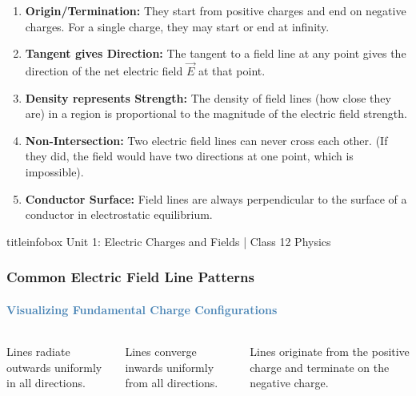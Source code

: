 \begin{frame}
\begin{frame}
\vspace{0.3cm}

\begin{examplebox}
\vspace{0.1cm}
\begin{enumerate}
    \item \textbf{Origin/Termination:} They start from positive charges and end on negative charges. For a single charge, they may start or end at infinity.
    \item \textbf{Tangent gives Direction:} The tangent to a field line at any point gives the direction of the net electric field $\vec{E}$ at that point.
    \item \textbf{Density represents Strength:} The density of field lines (how close they are) in a region is proportional to the magnitude of the electric field strength.
    \item \textbf{Non-Intersection:} Two electric field lines can never cross each other. (If they did, the field would have two directions at one point, which is impossible).
    \item \textbf{Conductor Surface:} Field lines are always perpendicular to the surface of a conductor in electrostatic equilibrium.
\end{enumerate}
\vspace{0.1cm}
\end{examplebox}

\vfill

\begin{beamercolorbox}[wd=\textwidth,ht=0.5cm,dp=0.1cm,center]{titleinfobox}
    \small\color{coolgray} Unit 1: Electric Charges and Fields | Class 12 Physics
\end{beamercolorbox}
\end{frame}

\begin{frame}
\frametitle{\textsf{\textbf{Common Electric Field Line Patterns}}}
\framesubtitle{\textcolor{steelblue}{Visualizing Fundamental Charge Configurations}}

\begin{columns}[T]
    \begin{keybox}
    Lines radiate outwards uniformly in all directions.
    \end{keybox}
    \vspace{0.2cm}
    \begin{keybox}
    Lines converge inwards uniformly from all directions.
    \end{keybox}
    \vspace{0.2cm}
    \begin{keybox}
    Lines originate from the positive charge and terminate on the negative charge.
    \end{keybox}
    

\end{columns}
\end{frame}
\end{frame}
